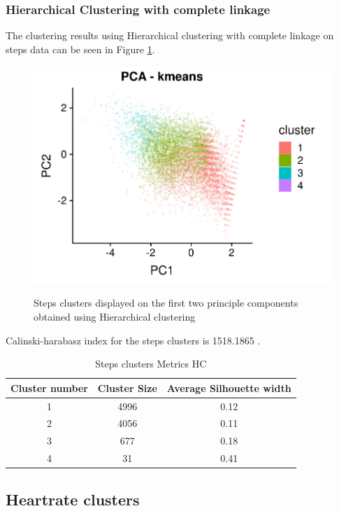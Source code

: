 \documentclass{article}
\begin{document}
\subsubsection{Hierarchical Clustering with complete linkage}

The clustering results using Hierarchical clustering with complete linkage on steps data can be seen in Figure \ref{fig:stepsClustersHC}.

\begin{figure}[htb]
  \centering
  \caption{Steps clusters displayed on the first two principle components obtained using Hierarchical clustering}
  \includegraphics[]{steps_HC_results.png}
  \label{fig:stepsClustersHC}
\end{figure}

Calinski-harabasz index for the steps clusters is 1518.1865 .

\begin{table}[H]
  \caption{Steps clusters Metrics HC}
  \label{steps_metrics}
  \centering
  \begin{tabular}{ c|c|c}
    \toprule
    \cmidrule(r){1-2}
    Cluster number & Cluster Size & Average Silhouette width \\
    \hline
    1 & 4996 & 0.12 \\
    2 & 4056 & 0.11 \\
    3 & 677 & 0.18 \\
    4 & 31 & 0.41 \\
    \bottomrule
    \end{tabular}
\end{table}

\subsection{Heartrate clusters}
\end{document}
